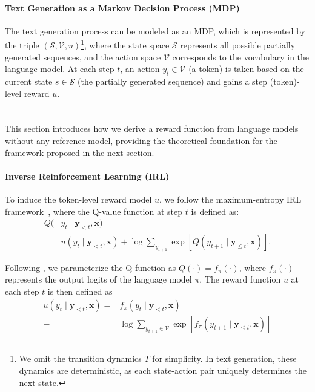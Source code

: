 \paragraph{Text Generation as a Markov Decision Process (MDP)}
The text generation process can be modeled as an MDP, which is represented by the triple $(\mathcal{S}, \mathcal{V}, u)$\footnote{We omit the transition dynamics $T$ for simplicity. In text generation, these dynamics are deterministic, as each state-action pair uniquely determines the next state.}, where the state space $\mathcal{S}$ represents all possible partially generated sequences, and the action space $\mathcal{V}$ corresponds to the vocabulary in the language model. At each step $t$, an action $y_t \in \mathcal{V}$ (a token) is taken based on the current state $s \in \mathcal{S}$ (the partially generated sequence) and gains a step (token)-level reward $u$. 

\section{}
This section introduces how we derive a reward function from language models without any reference model, providing the theoretical foundation for the framework proposed in the next section.

\paragraph{Inverse Reinforcement Learning (IRL)}
To induce the token-level reward model $u$, we follow the maximum-entropy IRL framework~\citep{ziebart2008maximum, chan2021scalable}, where the Q-value function at step $t$ is defined as:
\begin{align}
    Q(&y_t \mid \boldsymbol{y}_{<t}, \boldsymbol{x}) =\\
    &u(y_t \mid \boldsymbol{y}_{<t}, \boldsymbol{x}) + \log \sum_{y_{t+1}} \exp[Q(y_{t+1}\mid \boldsymbol{y}_{\leq t}, \boldsymbol{x})]. \nonumber
\end{align}

Following \citet{hao-2022-teacher}, we parameterize the Q-function as $Q(\cdot) = f_\pi(\cdot)$,
where $f_\pi(\cdot)$ represents the output logits of the language model $\pi$. The reward function $u$ at each step $t$ is then defined as
\begin{align}
    u(y_t \mid \boldsymbol{y}_{<t}, \boldsymbol{x}) =& f_\pi(y_t \mid \boldsymbol{y}_{<t}, \boldsymbol{x}) \\
    - &\log \sum_{y_{t+1}\in \mathcal{V}} \exp[f_\pi(y_{t+1}\mid \boldsymbol{y}_{\leq t}, \boldsymbol{x})]  \nonumber
\end{align}

